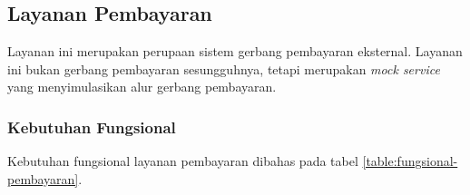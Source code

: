 \subsection{Layanan Pembayaran}

Layanan ini merupakan perupaan sistem gerbang pembayaran eksternal. Layanan ini bukan gerbang pembayaran sesungguhnya, tetapi merupakan \textit{mock service} yang menyimulasikan alur gerbang pembayaran.

\subsubsection{Kebutuhan Fungsional}

Kebutuhan fungsional layanan pembayaran dibahas pada tabel \ref{table:fungsional-pembayaran}.

\begingroup
\footnotesize
